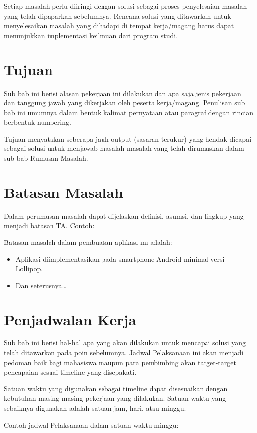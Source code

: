 \documentclass[a4paper,11pt,oneside]{report}
\begin{document}
Setiap masalah perlu diiringi dengan solusi sebagai proses penyelesaian masalah
yang telah dipaparkan sebelumnya. Rencana solusi yang ditawarkan untuk
menyelesaikan masalah yang dihadapi di tempat kerja/magang harus dapat
menunjukkan implementasi keilmuan dari program studi.

\section{Tujuan}
Sub bab ini berisi alasan pekerjaan ini dilakukan dan apa saja jenis pekerjaan
dan tanggung jawab yang dikerjakan oleh peserta kerja/magang. Penulisan sub bab
ini umumnya dalam bentuk kalimat pernyataan atau paragraf dengan rincian
berbentuk numbering.

Tujuan menyatakan seberapa jauh output (sasaran terukur) yang hendak dicapai
sebagai solusi untuk menjawab masalah-masalah yang telah dirumuskan dalam sub
bab Rumusan Masalah.

\section{Batasan Masalah}
Dalam perumusan masalah dapat dijelaskan definisi, asumsi, dan lingkup yang
menjadi batasan TA. Contoh:

Batasan masalah dalam pembuatan aplikasi ini adalah:
\begin{itemize}
    \item Aplikasi diimplementasikan pada smartphone Android minimal versi Lollipop.
    \item Dan seterusnya\ldots
\end{itemize}

\section{Penjadwalan Kerja}
Sub bab ini berisi hal-hal apa yang akan dilakukan untuk mencapai solusi yang
telah ditawarkan pada poin sebelumnya. Jadwal Pelaksanaan ini akan menjadi
pedoman baik bagi mahasiswa maupun para pembimbing akan target-target pencapaian
sesuai timeline yang disepakati.

Satuan waktu yang digunakan sebagai timeline dapat disesuaikan dengan kebutuhan
masing-masing pekerjaan yang dilakukan. Satuan waktu yang sebaiknya digunakan
adalah satuan jam, hari, atau minggu.

Contoh jadwal Pelaksanaan dalam satuan waktu minggu:
\end{document}
